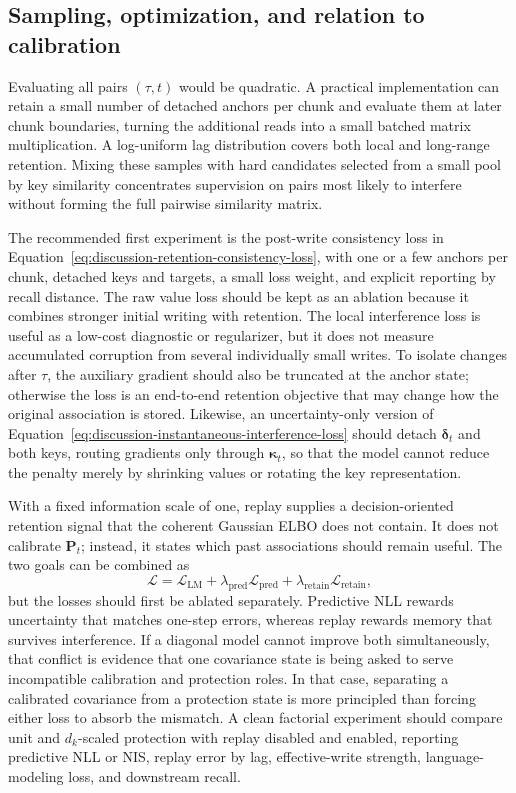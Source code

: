 \documentclass[11pt]{article}
\newcommand{\vct}[1]{\boldsymbol{#1}}
\begin{document}
\subsection{Sampling, optimization, and relation to calibration}

Evaluating all pairs $(\tau,t)$ would be quadratic. A practical implementation can retain a small
number of detached anchors per chunk and evaluate them at later chunk boundaries, turning the
additional reads into a small batched matrix multiplication. A log-uniform lag distribution covers
both local and long-range retention. Mixing these samples with hard candidates selected from a
small pool by key similarity concentrates supervision on pairs most likely to interfere without
forming the full pairwise similarity matrix.

The recommended first experiment is the post-write consistency loss in
Equation~\eqref{eq:discussion-retention-consistency-loss}, with one or a few anchors per chunk,
detached keys and targets, a small loss weight, and explicit reporting by recall distance. The raw
value loss should be kept as an ablation because it combines stronger initial writing with
retention. The local interference loss is useful as a low-cost diagnostic or regularizer, but it
does not measure accumulated corruption from several individually small writes. To isolate changes
after $\tau$, the auxiliary gradient should also be truncated at the anchor state; otherwise the
loss is an end-to-end retention objective that may change how the original association is stored.
Likewise, an uncertainty-only version of
Equation~\eqref{eq:discussion-instantaneous-interference-loss} should detach
$\vct{\delta}_t$ and both keys, routing gradients only through $\vct{\kappa}_t$, so that the model
cannot reduce the penalty merely by shrinking values or rotating the key representation.

With a fixed information scale of one, replay supplies a decision-oriented retention signal that
the coherent Gaussian ELBO does not contain. It does not calibrate $\vct{P}_t$; instead, it states
which past associations should remain useful. The two goals can be combined as
\begin{equation}
  \mathcal{L}
  =\mathcal{L}_{\mathrm{LM}}
  +\lambda_{\mathrm{pred}}\mathcal{L}_{\mathrm{pred}}
  +\lambda_{\mathrm{retain}}\mathcal{L}_{\mathrm{retain}},
  \label{eq:discussion-lm-calibration-retention-loss}
\end{equation}
but the losses should first be ablated separately. Predictive NLL rewards uncertainty that matches
one-step errors, whereas replay rewards memory that survives interference. If a diagonal model
cannot improve both simultaneously, that conflict is evidence that one covariance state is being
asked to serve incompatible calibration and protection roles. In that case, separating a
calibrated covariance from a protection state is more principled than forcing either loss to absorb
the mismatch. A clean factorial experiment should compare unit and $d_k$-scaled protection with
replay disabled and enabled, reporting predictive NLL or NIS, replay error by lag, effective-write
strength, language-modeling loss, and downstream recall.
\end{document}
